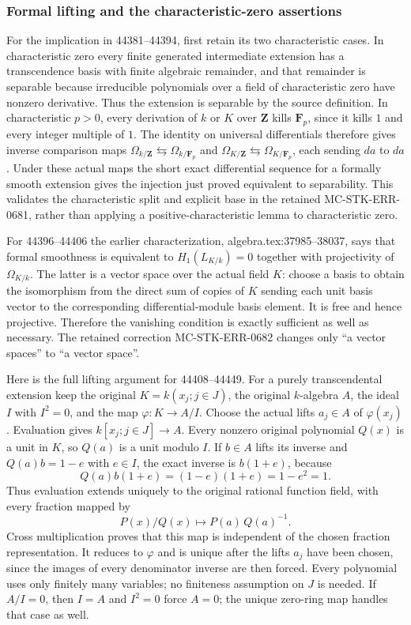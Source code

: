 \subsubsection{Formal lifting and the characteristic-zero assertions}\label{formal-lifting-and-the-characteristic-zero-assertions}

For the implication in 44381--44394, first retain its two characteristic cases. In characteristic zero every finite generated intermediate extension has a transcendence basis with finite algebraic remainder, and that remainder is separable because irreducible polynomials over a field of characteristic zero have nonzero derivative. Thus the extension is separable by the source definition. In characteristic \(p>0\), every derivation of \(k\) or \(K\) over \(\mathbf Z\) kills \(\mathbf F_p\), since it kills \(1\) and every integer multiple of \(1\). The identity on universal differentials therefore gives inverse comparison maps \(\Omega_{k/\mathbf Z}\leftrightarrows\Omega_{k/\mathbf F_p}\) and \(\Omega_{K/\mathbf Z}\leftrightarrows\Omega_{K/\mathbf F_p}\), each sending \(da\) to \(da\). Under these actual maps the short exact differential sequence for a formally smooth extension gives the injection just proved equivalent to separability. This validates the characteristic split and explicit base in the retained MC-STK-ERR-0681, rather than applying a positive-characteristic lemma to characteristic zero.

For 44396--44406 the earlier characterization, algebra.tex:37985--38037, says that formal smoothness is equivalent to \(H_1(L_{K/k})=0\) together with projectivity of \(\Omega_{K/k}\). The latter is a vector space over the actual field \(K\): choose a basis to obtain the isomorphism from the direct sum of copies of \(K\) sending each unit basis vector to the corresponding differential-module basis element. It is free and hence projective. Therefore the vanishing condition is exactly sufficient as well as necessary. The retained correction MC-STK-ERR-0682 changes only ``a vector spaces'' to ``a vector space''.

Here is the full lifting argument for 44408--44449. For a purely transcendental extension keep the original \(K=k(x_j;j\in J)\), the original \(k\)-algebra \(A\), the ideal \(I\) with \(I^2=0\), and the map \(\varphi:K\to A/I\). Choose the actual lifts \(a_j\in A\) of \(\varphi(x_j)\). Evaluation gives \(k[x_j;j\in J]\to A\). Every nonzero original polynomial \(Q(x)\) is a unit in \(K\), so \(Q(a)\) is a unit modulo \(I\). If \(b\in A\) lifts its inverse and \(Q(a)b=1-e\) with \(e\in I\), the exact inverse is \(b(1+e)\), because \[
 Q(a)b(1+e)=(1-e)(1+e)=1-e^2=1.
\] Thus evaluation extends uniquely to the original rational function field, with every fraction mapped by \[
 P(x)/Q(x)\longmapsto P(a)\,Q(a)^{-1}.
\] Cross multiplication proves that this map is independent of the chosen fraction representation. It reduces to \(\varphi\) and is unique after the lifts \(a_j\) have been chosen, since the images of every denominator inverse are then forced. Every polynomial uses only finitely many variables; no finiteness assumption on \(J\) is needed. If \(A/I=0\), then \(I=A\) and \(I^2=0\) force \(A=0\); the unique zero-ring map handles that case as well.

